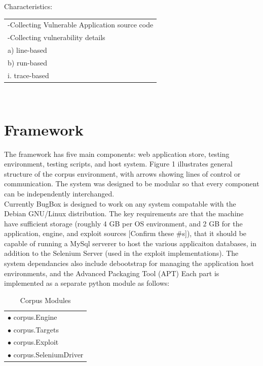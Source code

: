 \documentclass[letterpaper,twocolumn,10pt]{article}
\begin{document}
Characteristics:\\
 \begin{tabular} { l }
   -Collecting Vulnerable Application source code\\
   -Collecting vulnerability details\\
     a) line-based\\
     b) run-based\\
      i. trace-based\\
 \end{tabular}\\


\section{Framework}

The framework has five main components: web application store, testing environment, testing scripts, and host system. Figure 1 illustrates general structure of the corpus environment, with arrows showing lines of control or communication. The system was designed to be modular so that every component can be independently interchanged.\\
Currently BugBox is designed to work on any system compatable with the Debian GNU/Linux distribution. The key requirements are that the machine have sufficient storage (roughly 4 GB per OS environment, and 2 GB for the application, engine, and exploit sources [Confirm these #s]), that it should be capable of running a MySql serverer to host the various applicaiton databases, in addition to the Selenium Server (used in the exploit implementations). The system dependancies also include debootstrap for managing the application host environments, and the Advanced Packaging Tool (APT)   
Each part is implemented as a separate python module as follows:


 \begin{table}
 \begin{minipage}[b]{0.45\linewidth}
 \caption{Corpus Modules}
 \hline
 \begin{tabular}{ l }
   $\bullet$ corpus.Engine\\
   $\bullet$ corpus.Targets\\
   $\bullet$ corpus.Exploit\\
   $\bullet$ corpus.SeleniumDriver\\
 \end{tabular}
\end{minipage}
\end{table}
\end{document}
